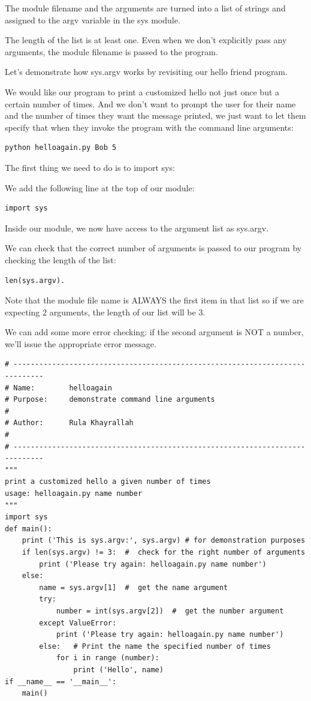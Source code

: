 \documentclass{article}
\begin{document}
The module filename and the arguments are turned into a list of strings and assigned to the argv variable in the sys module. 

The length of the list is at least one.  Even when we don’t explicitly pass any arguments, the module filename is passed to the program.

Let’s demonstrate how sys.argv works by revisiting our hello friend program.

We would like our program to print a customized hello not just once but a certain number of times.  And we don’t want to prompt the user for their name and the number of times they want the message printed, we just want to let them specify that when they invoke the program with the command line arguments:

\begin{lstlisting}
python helloagain.py Bob 5
\end{lstlisting}

The first thing we need to do is to import sys:

We add the following line at the top of our module:

\begin{lstlisting}
import sys
\end{lstlisting}

Inside our module, we now have access to the argument list as sys.argv.

We can check that the correct number of arguments is passed to our program by checking the length of the list: 
\begin{lstlisting}
len(sys.argv).
\end{lstlisting}

Note that the module file name is ALWAYS the first item in that list so if we are expecting 2 arguments, the length of our list will be 3.

We can add some more error checking: if the second argument is NOT a number, we'll issue the appropriate error message.

\begin{lstlisting}
# -----------------------------------------------------------------------------
# Name:        helloagain
# Purpose:     demonstrate command line arguments
#
# Author:      Rula Khayrallah
#
# -----------------------------------------------------------------------------
"""
print a customized hello a given number of times
usage: helloagain.py name number
"""
import sys
def main():
    print ('This is sys.argv:', sys.argv) # for demonstration purposes
    if len(sys.argv) != 3:  #  check for the right number of arguments
        print ('Please try again: helloagain.py name number')
    else:
        name = sys.argv[1]  #  get the name argument
        try:
            number = int(sys.argv[2])  #  get the number argument
        except ValueError:
            print ('Please try again: helloagain.py name number')
        else:   # Print the name the specified number of times
            for i in range (number):
                print ('Hello', name)
if __name__ == '__main__':
    main()
\end{lstlisting}
\end{document}
